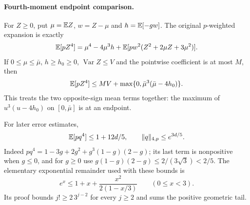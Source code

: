 \paragraph{Fourth-moment endpoint comparison.}
For $Z\ge0$, put $\mu=\mathbb E Z$, $w=Z-\mu$ and $h=\mathbb E[-gw]$.
The original $p$-weighted expansion is exactly
\[
 \mathbb E[pZ^4]=\mu^4-4\mu^3h+
            \mathbb E[pw^2(Z^2+2\mu Z+3\mu^2)].
\]
If $0\le\mu\le\bar\mu$, $h\ge h_0\ge0$,
$\operatorname{Var}Z\le V$ and the pointwise coefficient is at most $M$,
then
\begin{equation}\label{eq:compact-fourth-endpoints}
 \mathbb E[pZ^4]\le MV+\max\{0,\bar\mu^3(\bar\mu-4h_0)\}.
\end{equation}
This treats the two opposite-sign mean terms together: the maximum of
$u^3(u-4h_0)$ on $[0,\bar\mu]$ is at an endpoint.


For later error estimates,
\begin{equation}\label{eq:compact-qnorm}
 \mathbb E[pq^4]\le1+12d/5,\qquad \|q\|_{4,p}\le e^{3d/5}.
\end{equation}
Indeed $pq^4=1-3g+2g^2+g^3(1-g)(2-g)$; its last term is nonpositive
when $g\le0$, and for $g\ge0$ use
$g(1-g)(2-g)\le2/(3\sqrt3)<2/5$.
The elementary exponential remainder used with these bounds is
\begin{equation}\label{eq:compact-exp-remainder}
 e^x\le1+x+\frac{x^2}{2(1-x/3)}\qquad(0\le x<3).
\end{equation}
Its proof bounds $j!\ge2\,3^{j-2}$ for every $j\ge2$ and sums the
positive geometric tail.
